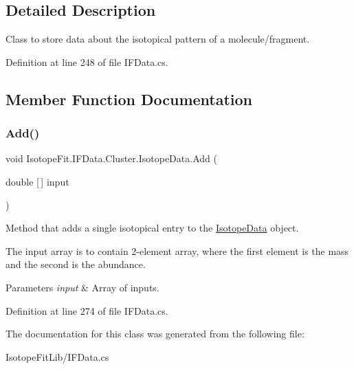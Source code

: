 \subsection{Detailed Description}
Class to store data about the isotopical pattern of a molecule/fragment. 



Definition at line 248 of file I\+F\+Data.\+cs.



\subsection{Member Function Documentation}
\mbox{\label{class_isotope_fit_1_1_i_f_data_1_1_cluster_1_1_isotope_data_a6f2c01094e5e4d0f68166664adeedd99}} 
\subsubsection{\texorpdfstring{Add()}{Add()}}
{\footnotesize\ttfamily void Isotope\+Fit.\+I\+F\+Data.\+Cluster.\+Isotope\+Data.\+Add (\begin{DoxyParamCaption}\item[{double \mbox{[}$\,$\mbox{]}}]{input }\end{DoxyParamCaption})}



Method that adds a single isotopical entry to the \hyperlink{class_isotope_fit_1_1_i_f_data_1_1_cluster_1_1_isotope_data}{Isotope\+Data} object. 

The input array is to contain 2-\/element array, where the first element is the mass and the second is the abundance. 


\begin{DoxyParams}{Parameters}
{\em input} & Array of inputs.\\
\hline
\end{DoxyParams}


Definition at line 274 of file I\+F\+Data.\+cs.



The documentation for this class was generated from the following file\+:\begin{DoxyCompactItemize}
\item 
Isotope\+Fit\+Lib/I\+F\+Data.\+cs\end{DoxyCompactItemize}
